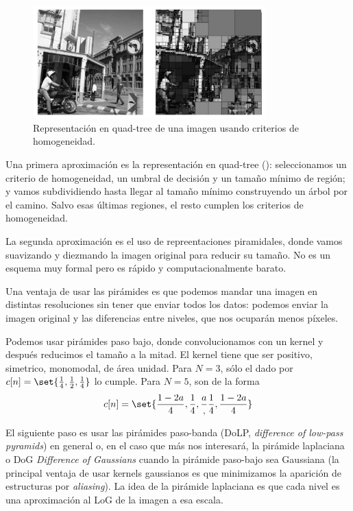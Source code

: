 \documentclass[nochap,palatino]{apuntes}
\begin{document}
\begin{figure}
\centering
\includegraphics[width=0.8\textwidth]{img/QuadTree.png}
\caption{Representación en quad-tree de una imagen usando criterios de homogeneidad.}
\label{fig:QuadTree}
\end{figure}

Una primera aproximación es la representación en quad-tree (): seleccionamos un criterio de homogeneidad, un umbral de decisión y un tamaño mínimo de región; y vamos subdividiendo hasta llegar al tamaño mínimo construyendo un árbol por el camino. Salvo esas últimas regiones, el resto cumplen los criterios de homogeneidad.

La segunda aproximación es el uso de repreentaciones piramidales, donde vamos suavizando y diezmando la imagen original para reducir su tamaño. No es un esquema muy formal pero es rápido y computacionalmente barato.

Una ventaja de usar las pirámides es que podemos mandar una imagen en distintas resoluciones sin tener que enviar todos los datos: podemos enviar la imagen original y las diferencias entre niveles, que nos ocuparán menos píxeles.

Podemos usar pirámides paso bajo, donde convolucionamos con un kernel y después reducimos el tamaño a la mitad. El kernel tiene que ser positivo, simetrico, monomodal, de área unidad. Para $N=3$, sólo el dado por $c[n] = \set{\frac{1}{4}, \frac{1}{2}, \frac{1}{4}}$ lo cumple. Para $N=5$, son de la forma \[ c[n] = \set{\frac{1 - 2a}{4}, \frac{1}{4}, \frac{a}, \frac{1}{4}, \frac{1 - 2a}{4}} \]

El siguiente paso es usar las pirámides paso-banda (DoLP, \textit{difference of low-pass pyramids}) en general o, en el caso que más nos interesará, la pirámide laplaciana o DoG \textit{Difference of Gaussians} cuando la pirámide paso-bajo sea Gaussiana (la principal ventaja de usar kernels gaussianos es que minimizamos la aparición de estructuras por \textit{aliasing}). La idea de la pirámide laplaciana es que cada nivel es una aproximación al LoG de la imagen a esa escala.
\end{document}
